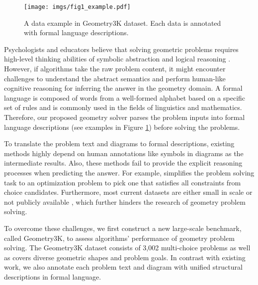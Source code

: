 \documentclass[11pt,a4paper]{article}
\begin{document}
\begin{figure}[t]
    \centering 
    \texttt{[image: imgs/fig1\_example.pdf]}
    \vspace{0mm}
    \caption{A data example in Geometry3K dataset. Each data is annotated with formal language descriptions.}
    \vspace{0mm}
    \label{fig1:example}
\end{figure}

Psychologists and educators believe that solving geometric problems requires high-level thinking abilities of symbolic abstraction and logical reasoning \cite{chinnappan1998schemas,nur2017geometry}. However, if algorithms take the raw problem content, it might encounter challenges to understand the abstract semantics and perform human-like cognitive reasoning for inferring the answer in the geometry domain. A formal language is composed of words from a well-formed alphabet based on a specific set of rules and is commonly used in the fields of linguistics and mathematics. Therefore, our proposed geometry solver parses the problem inputs into formal language descriptions (see examples in Figure \ref{fig1:example}) before solving the problems.



To translate the problem text and diagrams to formal descriptions, existing methods \citep{seo2015solving,sachan2017textbooks,sachan2017learning} highly depend on human annotations like symbols in diagrams as the intermediate results. Also, these methods fail to provide the explicit reasoning processes when predicting the answer. For example, \cite{seo2015solving} simplifies the problem solving task to an optimization problem to pick one that satisfies all constraints from choice candidates. Furthermore, most current datasets are either small in scale or not publicly available \cite{seo2015solving, sachan2017learning}, which further hinders the research of geometry problem solving.

To overcome these challenges, we first construct a new large-scale benchmark, called Geometry3K, to assess algorithms' performance of geometry problem solving. The Geometry3K dataset consists of 3,002 multi-choice problems as well as covers diverse geometric shapes and problem goals. In contrast with existing work, we also annotate each problem text and diagram with unified structural descriptions in formal language.
\end{document}
